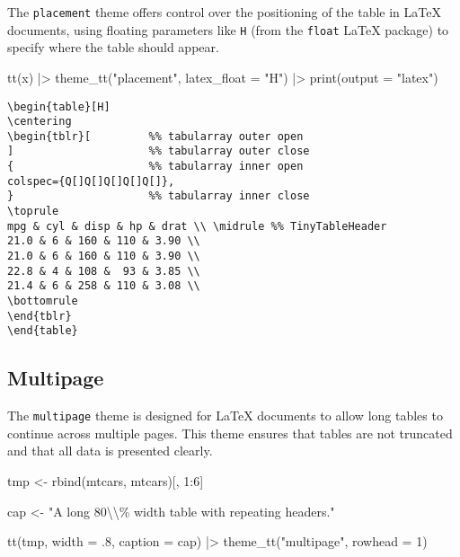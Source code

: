 \documentclass[
  letterpaper,
  DIV=11,
  numbers=noendperiod]{scrartcl}
\newenvironment{Shaded}{\begin{snugshade}}{\end{snugshade}}
\newcommand{\AttributeTok}[1]{\textcolor[rgb]{0.40,0.45,0.13}{#1}}
\newcommand{\DecValTok}[1]{\textcolor[rgb]{0.68,0.00,0.00}{#1}}
\newcommand{\FunctionTok}[1]{\textcolor[rgb]{0.28,0.35,0.67}{#1}}
\newcommand{\NormalTok}[1]{\textcolor[rgb]{0.00,0.23,0.31}{#1}}
\newcommand{\OtherTok}[1]{\textcolor[rgb]{0.00,0.23,0.31}{#1}}
\newcommand{\SpecialCharTok}[1]{\textcolor[rgb]{0.37,0.37,0.37}{#1}}
\newcommand{\StringTok}[1]{\textcolor[rgb]{0.13,0.47,0.30}{#1}}
\begin{document}
The \texttt{placement} theme offers control over the positioning of the
table in LaTeX documents, using floating parameters like \texttt{H}
(from the \texttt{float} LaTeX package) to specify where the table
should appear.

\begin{Shaded}
\begin{Highlighting}[]
\FunctionTok{tt}\NormalTok{(x) }\SpecialCharTok{|\textgreater{}}
  \FunctionTok{theme\_tt}\NormalTok{(}\StringTok{"placement"}\NormalTok{, }\AttributeTok{latex\_float =} \StringTok{"H"}\NormalTok{) }\SpecialCharTok{|\textgreater{}}
  \FunctionTok{print}\NormalTok{(}\AttributeTok{output =} \StringTok{"latex"}\NormalTok{)}
\end{Highlighting}
\end{Shaded}

\begin{verbatim}
\begin{table}[H]
\centering
\begin{tblr}[         %% tabularray outer open
]                     %% tabularray outer close
{                     %% tabularray inner open
colspec={Q[]Q[]Q[]Q[]Q[]},
}                     %% tabularray inner close
\toprule
mpg & cyl & disp & hp & drat \\ \midrule %% TinyTableHeader
21.0 & 6 & 160 & 110 & 3.90 \\
21.0 & 6 & 160 & 110 & 3.90 \\
22.8 & 4 & 108 &  93 & 3.85 \\
21.4 & 6 & 258 & 110 & 3.08 \\
\bottomrule
\end{tblr}
\end{table} 
\end{verbatim}

\subsection{Multipage}\label{multipage}

The \texttt{multipage} theme is designed for LaTeX documents to allow
long tables to continue across multiple pages. This theme ensures that
tables are not truncated and that all data is presented clearly.

\begin{Shaded}
\begin{Highlighting}[]
\NormalTok{tmp }\OtherTok{\textless{}{-}} \FunctionTok{rbind}\NormalTok{(mtcars, mtcars)[, }\DecValTok{1}\SpecialCharTok{:}\DecValTok{6}\NormalTok{]}

\NormalTok{cap }\OtherTok{\textless{}{-}} \StringTok{"A long 80}\SpecialCharTok{\textbackslash{}\textbackslash{}}\StringTok{\% width table with repeating headers."}

\FunctionTok{tt}\NormalTok{(tmp, }\AttributeTok{width =}\NormalTok{ .}\DecValTok{8}\NormalTok{, }\AttributeTok{caption =}\NormalTok{ cap) }\SpecialCharTok{|\textgreater{}} 
    \FunctionTok{theme\_tt}\NormalTok{(}\StringTok{"multipage"}\NormalTok{, }\AttributeTok{rowhead =} \DecValTok{1}\NormalTok{)}
\end{Highlighting}
\end{Shaded}
\end{document}
